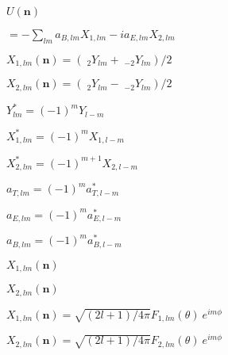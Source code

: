 \documentclass[12pt,twoside]{article}
\def\lthtmlcheckvsize{\ifdim\ht\sizebox<\vsize 
  \ifdim\wd\sizebox<\hsize\expandafter\hfill\fi \expandafter\vfill
  \else\expandafter\vss\fi}%
\begin{document}
{\newpage\clearpage
{}%
$\displaystyle U(\textbf{n})$%
\lthtmlindisplaymathZ
\lthtmlcheckvsize\clearpage}

{\newpage\clearpage
{}%
$\displaystyle = -\sum_{lm} a_{B,lm} X_{1,lm}-i a_{E,lm} X_{2,lm}$%
\lthtmlindisplaymathZ
\lthtmlcheckvsize\clearpage}

{\newpage\clearpage
{}%
$ X_{1,lm}(\textbf{n})=(\;_2Y_{lm}+\;_{-2}Y_{lm})/2$%
\lthtmlindisplaymathZ
\lthtmlcheckvsize\clearpage}

{\newpage\clearpage
{}%
$ X_{2,lm}(\textbf{n})=(\;_2Y_{lm}-\;_{-2}Y_{lm})/ 2$%
\lthtmlindisplaymathZ
\lthtmlcheckvsize\clearpage}

{\newpage\clearpage
{}%
$ Y^{*}_{lm} = (-1)^m Y_{l-m}$%
\lthtmlindisplaymathZ
\lthtmlcheckvsize\clearpage}

{\newpage\clearpage
{}%
$ X^{*}_{1,lm}=(-1)^m X_{1,l-m}$%
\lthtmlindisplaymathZ
\lthtmlcheckvsize\clearpage}

{\newpage\clearpage
{}%
$ X^*_{2,lm}=(-1)^{m+1}X_{2,l-m}$%
\lthtmlindisplaymathZ
\lthtmlcheckvsize\clearpage}

{\newpage\clearpage
{}%
$ a_{T,lm}=(-1)^m a_{T,l-m}^*$%
\lthtmlindisplaymathZ
\lthtmlcheckvsize\clearpage}

{\newpage\clearpage
{}%
$ a_{E,lm}=(-1)^m a_{E,l-m}^*$%
\lthtmlindisplaymathZ
\lthtmlcheckvsize\clearpage}

{\newpage\clearpage
{}%
$ a_{B,lm}=(-1)^m a_{B,l-m}^*$%
\lthtmlindisplaymathZ
\lthtmlcheckvsize\clearpage}

{\newpage\clearpage
{}%
$ X_{1,lm}(\textbf{n})$%
\lthtmlindisplaymathZ
\lthtmlcheckvsize\clearpage}

{\newpage\clearpage
{}%
$ X_{2,lm}(\textbf{n})$%
\lthtmlindisplaymathZ
\lthtmlcheckvsize\clearpage}

{\newpage\clearpage
{}%
$ {X_{1,lm}(\textbf{n})=\sqrt{(2l+1) / 4\pi} F_{1,lm}(\theta)\  e^{im\phi}}$%
\lthtmlindisplaymathZ
\lthtmlcheckvsize\clearpage}

{\newpage\clearpage
{}%
$ {X_{2,lm}(\textbf{n})=\sqrt{(2l+1) / 4\pi} F_{2,lm}(\theta)\  e^{im\phi}}$%
\lthtmlindisplaymathZ
\lthtmlcheckvsize\clearpage}
\end{document}

